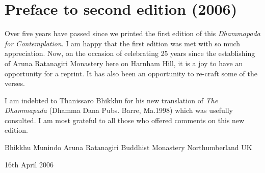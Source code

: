 
\chapter{Preface to second edition (2006)}

Over five years have passed since we printed the first edition of this \emph{Dhammapada for Contemplation}. I am happy that the first edition was met with so much appreciation. Now, on the occasion of celebrating 25 years since the establishing of Aruna Ratanagiri Monastery here on Harnham Hill, it is a joy to have an opportunity for a reprint. It has also been an opportunity to re-craft some of  the verses.  

I am indebted to Thanissaro Bhikkhu for his new translation of \emph{The Dhammapada} (Dhamma Dana Pubs. Barre, Ma.1998) which was usefully consulted. I am most grateful to all those who offered comments on this new edition.

Bhikkhu Munindo
Aruna Ratanagiri Buddhist Monastery
Northumberland
UK

16th  April 2006

